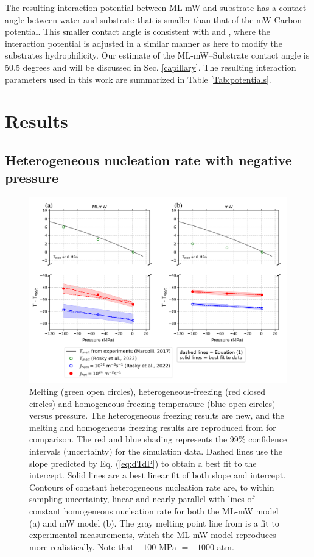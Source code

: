 \documentclass[journal abbreviation, manuscript]{copernicus}
\begin{document}
The resulting interaction potential between ML-mW and substrate has a contact angle between water and substrate that is smaller than that of the mW-Carbon potential. This smaller contact angle is consistent with \citet{Bi2016} and \citet{lupi2014hydrophilicity}, where the interaction potential is adjusted in a similar manner as here to modify the substrates hydrophilicity. Our estimate of the ML-mW--Substrate contact angle is 50.5 degrees and will be discussed in Sec. \ref{capillary}. The resulting interaction parameters used in this work are summarized in Table \ref{Tab:potentials}.



\section{Results}
\subsection{Heterogeneous nucleation rate with negative pressure} \label{sec:hetrate}

\begin{figure}[t]
\includegraphics[width=12cm]{figures/homohet_PT_figure.png}
\caption{\label{fig:PT} Melting (green open circles), heterogeneous-freezing (red closed circles) and homogeneous freezing temperature (blue open circles) versus pressure. The heterogeneous freezing results are new, and the melting and homogeneous freezing results are reproduced from \citet{rosky2022} for comparison. The red and blue shading represents the 99\% confidence intervals (uncertainty) for the simulation data. Dashed lines use the slope predicted by Eq. (\ref{eq:dTdP}) to obtain a best fit to the intercept. Solid lines are a best linear fit of both slope and intercept. Contours of constant heterogeneous nucleation rate are, to within sampling uncertainty, linear and nearly parallel with lines of constant homogeneous nucleation rate for both the ML-mW model (a) and mW model (b).  The gray melting point line from \citet{marcolli2017} is a fit to experimental measurements, which the ML-mW model reproduces more realistically. Note that $-100$ MPa $= -1000$ atm.}
\end{figure}
\end{document}
